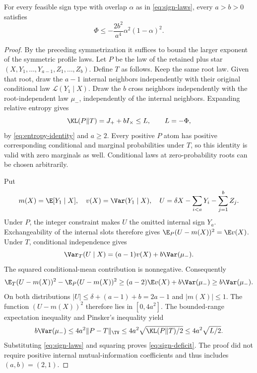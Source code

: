 \begin{lemma}\label{lem:sign-deficit}
For every feasible sign type with overlap $\alpha$ as in
\eqref{eq:sign-laws}, every $a>b>0$ satisfies
\begin{equation}\label{eq:sign-deficit}
 \Phi\le-\frac{2b^2}{a^4}\alpha^2(1-\alpha)^2.
\end{equation}
\end{lemma}
\begin{proof}
By the preceding symmetrization it suffices to bound the larger
exponent of the symmetric profile laws. Let $P$ be the
law of the retained plus star
$(X,Y_1,\ldots,Y_{a-1},Z_1,\ldots,Z_b)$. Define $T$ as follows.
Keep the same root law. Given that root, draw the $a-1$ internal
neighbors independently with their original conditional law
$\mathcal L(Y_1\mid X)$. Draw the $b$ cross neighbors independently
with the root-independent law $\mu_-$, independently of the internal
neighbors. Expanding relative entropy gives
\begin{equation}\label{eq:KL-star}
 \KL(P\Vert T)=J_++bI_\times\le L,
 \qquad L=-\Phi,
\end{equation}
by \eqref{eq:entropy-identity} and $a\ge2$.
Every positive $P$ atom has positive corresponding conditional and
marginal probabilities under $T$, so this identity is valid with zero
marginals as well. Conditional laws at zero-probability roots can be
chosen arbitrarily.

Put
\[
 m(X)=\E[Y_1\mid X],\quad v(X)=\Var(Y_1\mid X),\quad
 U=\delta X-\sum_{i<a}Y_i-\sum_{j=1}^bZ_j.
\]
Under $P$, the integer constraint makes $U$ the omitted internal sign
$Y_a$. Exchangeability of the internal slots therefore gives
$\E_P(U-m(X))^2=\E v(X)$. Under $T$, conditional independence gives
\[
 \Var_T(U\mid X)=(a-1)v(X)+b\Var(\mu_-).
\]
The squared conditional-mean contribution is nonnegative. Consequently
\begin{equation}\label{eq:variance-difference}
 \E_T(U-m(X))^2-\E_P(U-m(X))^2
 \ge(a-2)\E v(X)+b\Var(\mu_-)
 \ge b\Var(\mu_-).
\end{equation}
On both distributions $|U|\le\delta+(a-1)+b=2a-1$ and $|m(X)|\le1$.
The function $(U-m(X))^2$ therefore lies in $[0,4a^2]$.
The bounded-range expectation inequality and Pinsker's inequality yield
\[
 b\Var(\mu_-)
 \le4a^2\|P-T\|_{\TV}
 \le4a^2\sqrt{\KL(P\Vert T)/2}
 \le4a^2\sqrt{L/2}.
\]
Substituting \eqref{eq:sign-laws} and squaring proves
\eqref{eq:sign-deficit}. The proof did not require positive internal
mutual-information coefficients and thus includes $(a,b)=(2,1)$.
\end{proof}

